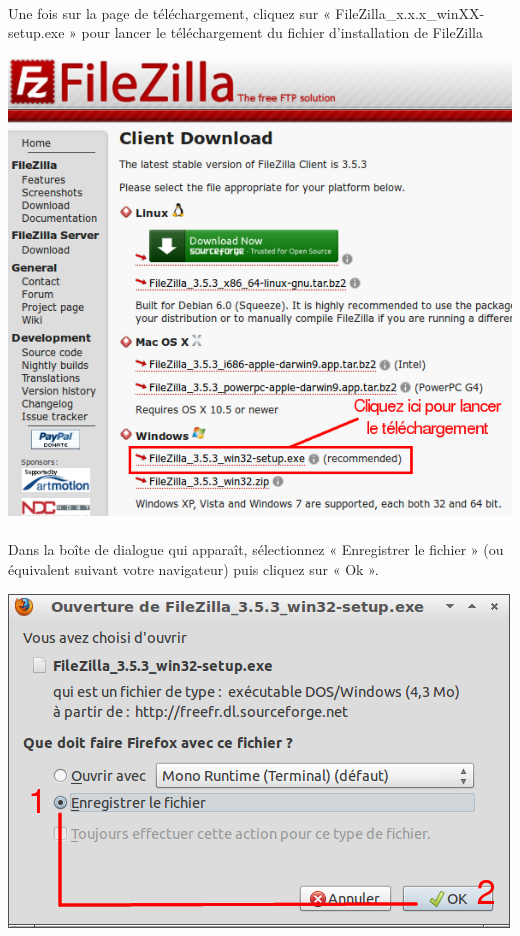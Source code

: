 \documentclass[10pt,a4paper]{article}
\begin{document}
\paragraph{}Une fois sur la page de téléchargement, cliquez sur « FileZilla\_x.x.x\_winXX-setup.exe » pour lancer le téléchargement du fichier d'installation de FileZilla
\begin{center}
\includegraphics[scale=0.4]{img/0013.png}
\end{center}
\paragraph{}Dans la boîte de dialogue qui apparaît, sélectionnez « Enregistrer le fichier » (ou équivalent suivant votre navigateur) puis cliquez sur « Ok ».
\begin{center}
\includegraphics[scale=0.5]{img/0014.png}
\end{center}
\end{document}
